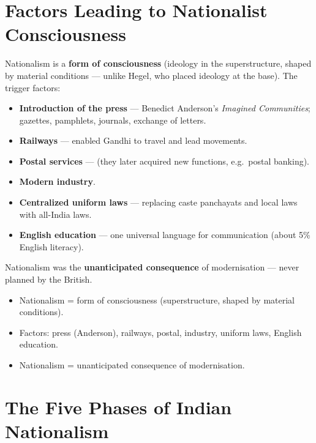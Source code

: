 \section{Factors Leading to Nationalist Consciousness}

Nationalism is a \textbf{form of consciousness} (ideology in the superstructure, shaped by material conditions --- unlike Hegel, who placed ideology at the base). The trigger factors:
\begin{itemize}
\item \textbf{Introduction of the press} --- Benedict Anderson's \emph{Imagined Communities}; gazettes, pamphlets, journals, exchange of letters.
\item \textbf{Railways} --- enabled Gandhi to travel and lead movements.
\item \textbf{Postal services} --- (they later acquired new functions, e.g.\ postal banking).
\item \textbf{Modern industry}.
\item \textbf{Centralized uniform laws} --- replacing caste panchayats and local laws with all-India laws.
\item \textbf{English education} --- one universal language for communication (about 5\% English literacy).
\end{itemize}

\begin{CriticalPoint}
Nationalism was the \textbf{unanticipated consequence} of modernisation --- never planned by the British.
\end{CriticalPoint}

\begin{QuickRevision}
\begin{itemize}
\item Nationalism = form of consciousness (superstructure, shaped by material conditions).
\item Factors: press (Anderson), railways, postal, industry, uniform laws, English education.
\item Nationalism = unanticipated consequence of modernisation.
\end{itemize}
\end{QuickRevision}

\section{The Five Phases of Indian Nationalism}

